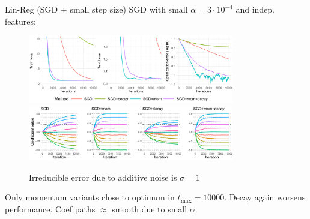 \documentclass[11pt,compress,t,notes=noshow, xcolor=table]{beamer}
\begin{document}
\begin{vbframe}{Lin-Reg (SGD + small step size)}
\vspace{-0.4cm}
SGD with small $\alpha=3\cdot10^{-4}$ and indep. features:
\begin{figure}
            \includegraphics[width=0.8\textwidth]{slides/04-multivariate-first-order/figure_man/simu_linmod/SGD_reg_small_lr_iters.pdf} \\
             \includegraphics[width=0.8\textwidth]{slides/04-multivariate-first-order/figure_man/simu_linmod/SGD_reg_coef_small.pdf}\\
            \begin{footnotesize}
                Irreducible error due to additive noise is $\sigma=1$
            \end{footnotesize}
\end{figure}
Only momentum variants close to optimum in $t_{\text{max}}=10000$. Decay again worsens performance. Coef paths $\approx$ smooth due to small $\alpha$. 
\end{vbframe}
\end{document}
